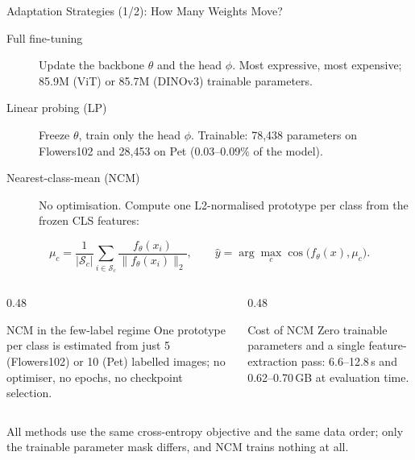 \documentclass[10pt, aspectratio=169]{beamer}
\begin{document}
\begin{frame}[t]{Adaptation Strategies (1/2): How Many Weights Move?}
  \small
  \begin{description}
    \item[Full fine-tuning] Update the backbone $\theta$ and the head $\phi$. Most expressive, most expensive; 85.9M (ViT) or 85.7M (DINOv3) trainable parameters.
    \item[Linear probing (LP)] Freeze $\theta$, train only the head $\phi$. Trainable: 78{,}438 parameters on Flowers102 and 28{,}453 on Pet (0.03--0.09\% of the model).
    \item[Nearest-class-mean (NCM)] No optimisation. Compute one L2-normalised prototype per class from the frozen CLS features:
  \end{description}

  \[
    \mu_c = \frac{1}{|\mathcal{S}_c|}\sum_{i\in\mathcal{S}_c}
    \frac{f_\theta(x_i)}{\lVert f_\theta(x_i)\rVert_2},
    \qquad
    \hat{y} = \arg\max_c \cos\!\big(f_\theta(x), \mu_c\big).
  \]

  \vspace{-0.15cm}
  \begin{columns}[T]
    \begin{column}{0.48\textwidth}
      \begin{block}{NCM in the few-label regime}
        \footnotesize
        One prototype per class is estimated from just 5 (Flowers102) or 10 (Pet) labelled images; no optimiser, no epochs, no checkpoint selection.
      \end{block}
    \end{column}
    \begin{column}{0.48\textwidth}
      \begin{block}{Cost of NCM}
        \footnotesize
        Zero trainable parameters and a single feature-extraction pass: 6.6--12.8\,s and 0.62--0.70\,GB at evaluation time.
      \end{block}
    \end{column}
  \end{columns}

  \vspace{0.1cm}
  \footnotesize
  All methods use the same cross-entropy objective and the same data order; only the trainable parameter mask differs, and NCM trains nothing at all.
\end{frame}
\end{document}
